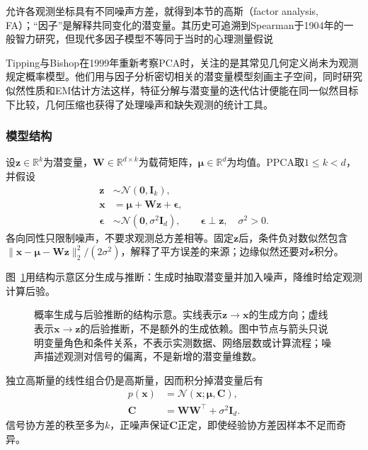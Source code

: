 允许各观测坐标具有不同噪声方差，就得到本节的高斯（factor analysis, FA）；“因子”是解释共同变化的潜变量。其历史可追溯到Spearman于1904年的一般智力研究，但现代多因子模型不等同于当时的心理测量假说

Tipping与Bishop在1999年重新考察PCA时，关注的是其常见几何定义尚未为观测规定概率模型。他们用与因子分析密切相关的潜变量模型刻画主子空间，同时研究似然性质和EM估计方法这样，特征分解与潜变量的迭代估计便能在同一似然目标下比较，几何压缩也获得了处理噪声和缺失观测的统计工具。

\subsubsection{模型结构}
\label{sec:dim-ppca-structure}

设$\bm{z}\in\mathbb{R}^k$为潜变量，$\bm{W}\in\mathbb{R}^{d\times k}$为载荷矩阵，$\bm{\mu}\in\mathbb{R}^d$为均值。PPCA取$1\leq k<d$，并假设
\begin{equation}
\label{eq:dim-ppca-generative}
\begin{aligned}
\bm{z}&\sim\mathcal{N}(\bm{0},\bm{I}_k),\\
\bm{x}&=\bm{\mu}+\bm{W}\bm{z}+\bm{\epsilon},\\
\bm{\epsilon}&\sim\mathcal{N}(\bm{0},\sigma^2\bm{I}_d),
\qquad \bm{\epsilon}\perp\bm{z},\quad \sigma^2>0.
\end{aligned}
\end{equation}
各向同性只限制噪声，不要求观测总方差相等。固定$\bm{z}$后，条件负对数似然包含$\lVert\bm{x}-\bm{\mu}-\bm{W}\bm{z}\rVert_2^2/(2\sigma^2)$，解释了平方误差的来源；边缘似然还要对$\bm{z}$积分。

图~\ref{fig:dim-latent-model}用结构示意区分生成与推断：生成时抽取潜变量并加入噪声，降维时给定观测计算后验。
\begin{figure}[htbp]
\centering

\caption{概率生成与后验推断的结构示意。实线表示$\bm{z}\to\bm{x}$的生成方向；虚线表示$\bm{x}\to\bm{z}$的后验推断，不是额外的生成依赖。图中节点与箭头只说明变量角色和条件关系，不表示实测数据、网络层数或计算流程；噪声描述观测对信号的偏离，不是新增的潜变量维数。}
\label{fig:dim-latent-model}
\end{figure}

独立高斯量的线性组合仍是高斯量，因而积分掉潜变量后有
\begin{equation}
\label{eq:dim-ppca-marginal}
\begin{aligned}
p(\bm{x})&=\mathcal{N}(\bm{x};\bm{\mu},\bm{C}),\\
\bm{C}&=\bm{W}\bm{W}^\top+\sigma^2\bm{I}_d.
\end{aligned}
\end{equation}
信号协方差的秩至多为$k$，正噪声保证$\bm{C}$正定，即使经验协方差因样本不足而奇异。

